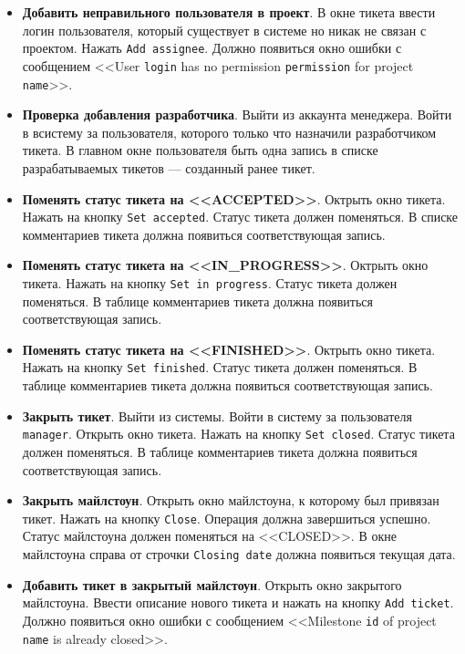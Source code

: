\begin{itemize}
\item \textbf{Добавить неправильного пользователя в проект}. В окне тикета ввести логин пользователя, который существует в системе но никак не связан с проектом. Нажать \texttt{Add assignee}. Должно появиться окно ошибки с сообщением <<User \texttt{login} has no permission \texttt{permission} for project \texttt{name}>>.

\item \textbf{Проверка добавления разработчика}. Выйти из аккаунта менеджера. Войти в всистему за пользователя, которого только что назначили разработчиком тикета. В главном окне пользователя быть одна запись в списке разрабатываемых тикетов --- созданный ранее тикет.

\item \textbf{Поменять статус тикета на <<ACCEPTED>>}. Октрыть окно тикета. Нажать на кнопку \texttt{Set accepted}. Статус тикета должен поменяться. В списке комментариев тикета должна появиться соответствующая запись.

\item \textbf{Поменять статус тикета на <<IN\_PROGRESS>>}. Октрыть окно тикета. Нажать на кнопку \texttt{Set in progress}. Статус тикета должен поменяться. В таблице комментариев тикета должна появиться соответствующая запись.

\item \textbf{Поменять статус тикета на <<FINISHED>>}. Октрыть окно тикета. Нажать на кнопку \texttt{Set finished}. Статус тикета должен поменяться. В таблице комментариев тикета должна появиться соответствующая запись.

\item \textbf{Закрыть тикет}. Выйти из системы. Войти в систему за пользователя \texttt{manager}. Открыть окно тикета. Нажать на кнопку \texttt{Set closed}. Статус тикета должен поменяться. В таблице комментариев тикета должна появиться соответствующая запись.

\item \textbf{Закрыть майлстоун}. Открыть окно майлстоуна, к которому был привязан тикет. Нажать на кнопку \texttt{Close}. Операция должна завершиться успешно. Статус майлстоуна должен поменяться на <<CLOSED>>. В окне майлстоуна справа от строчки \texttt{Closing date} должна появиться текущая дата.

\item \textbf{Добавить тикет в закрытый майлстоун}. Открыть окно закрытого майлстоуна. Ввести описание нового тикета и нажать на кнопку \texttt{Add ticket}. Должно появиться окно ошибки с сообщением <<Milestone \texttt{id} of project \texttt{name} is already closed>>.


\end{itemize}
